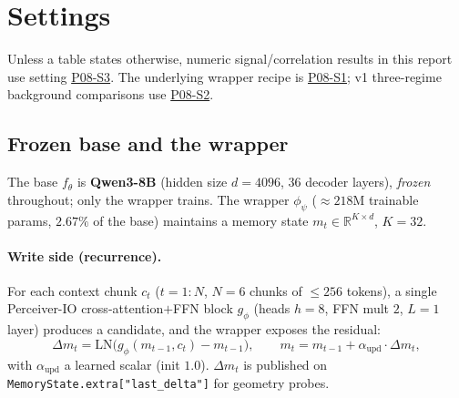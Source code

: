 \documentclass[11pt]{article}
\newcommand{\code}[1]{\texttt{#1}}
\begin{document}
\section{Settings}
\label{sec:settings}

Unless a table states otherwise, numeric signal/correlation results in
this report use setting
\href{https://github.com/BDeMo/research-notes/blob/main/notes/plans/08-model-outputs-delta-w/settings.md#p08-s3--v15-intrinsic-signal-probe}{P08-S3}.
The underlying wrapper recipe is
\href{https://github.com/BDeMo/research-notes/blob/main/notes/plans/08-model-outputs-delta-w/settings.md#p08-s1--v1-canonical-wrapper-recipe}{P08-S1};
v1 three-regime background comparisons use
\href{https://github.com/BDeMo/research-notes/blob/main/notes/plans/08-model-outputs-delta-w/settings.md#p08-s2--v1-phase-y-three-regime-benchmark-cells}{P08-S2}.

\subsection{Frozen base and the wrapper}
The base $f_\theta$ is \textbf{Qwen3-8B} (hidden size $d=4096$, $36$
decoder layers), \emph{frozen} throughout; only the wrapper trains. The
wrapper $\phi_\psi$ ($\approx 218$M trainable params, $2.67\%$ of the
base) maintains a memory state $m_t\in\mathbb{R}^{K\times d}$, $K=32$.

\paragraph{Write side (recurrence).} For each context chunk $c_t$
($t=1{:}N$, $N=6$ chunks of $\le 256$ tokens), a single Perceiver-IO
cross-attention$+$FFN block $g_\phi$ (heads $h=8$, FFN mult $2$,
$L=1$ layer) produces a candidate, and the wrapper exposes the residual:
\begin{equation}
\Delta m_t = \mathrm{LN}\!\big(g_\phi(m_{t-1},c_t)-m_{t-1}\big),
\qquad
m_t = m_{t-1} + \alpha_{\mathrm{upd}}\cdot \Delta m_t,
\end{equation}
with $\alpha_{\mathrm{upd}}$ a learned scalar (init $1.0$). $\Delta m_t$
is published on \code{MemoryState.extra["last\_delta"]} for geometry
probes.
\end{document}
